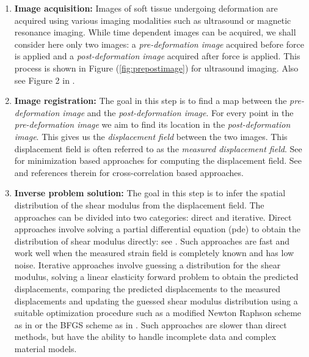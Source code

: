 \documentclass[12pt]{article}
\begin{document}
\begin{enumerate}
\item{\textbf{Image acquisition:} Images of soft tissue undergoing deformation are acquired using various imaging modalities such as ultrasound or magnetic resonance imaging. While time dependent images can be acquired, we shall consider here only two images: a \textit{pre-deformation image} acquired before force is applied and a \textit{post-deformation image} acquired after force is applied. This process is shown in Figure (\ref{fig:prepostimage}) for ultrasound imaging. Also see Figure 2 in \cite{paper:konofagou2004}}.
\item{\textbf{Image registration:} The goal in this step is to find a map between the \textit{pre-deformation image} and the \textit{post-deformation image}. For every point in the \textit{pre-deformation image} we aim to find its location in the \textit{post-deformation image}. This gives us the \textit{displacement field} between the two images. This displacement field is often referred to as the \textit{measured displacement field}. See \cite{paper:richards2009,paper:gokhale2004,paper:pellot-barakat2004}} for minimization based approaches for computing the displacement field. See \cite{paper:ophir1991,paper:ophir1996,paper:alam1998} and references therein for cross-correlation based approaches.
\item{\textbf{Inverse problem solution:} The goal in this step is to infer the spatial distribution of the shear modulus from the displacement field. The approaches can be divided into two categories: direct and iterative. Direct approaches involve solving a partial differential equation (pde) to obtain the distribution of shear modulus directly: see \cite{paper:raghavan1994,paper:barboneadjwt,paper:albocher}. Such approaches are fast and work well when the measured strain field is completely known and has low noise. Iterative approaches \cite{paper:oberai2003,paper:gokhale2008,paper:kalle1996,paper:doyley,paper:goenezen2011} involve guessing a distribution for the shear modulus, solving a linear elasticity forward problem to obtain the predicted displacements, comparing the predicted displacements to the measured displacements and updating the guessed shear modulus distribution using a suitable optimization procedure such as a modified Newton Raphson scheme as in \cite{paper:doyley} or the BFGS scheme as in \cite{paper:gokhale2008,paper:goenezen2011}}. Such approaches are slower than direct methods, but have the ability to handle incomplete data and complex material models.
\end{enumerate}
\end{document}
